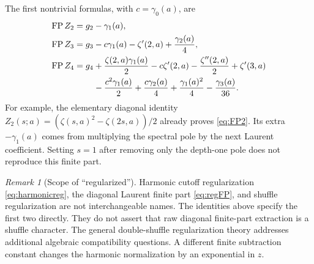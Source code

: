 \documentclass[11pt]{article}
\numberwithin{equation}{section}
\theoremstyle{definition}\newtheorem{definition}[theorem]{Definition}
\theoremstyle{remark}\newtheorem{remark}[theorem]{Remark}
\DeclareMathOperator{\FP}{FP}
\begin{document}
The first nontrivial formulas, with $c=\gamma_0(a)$, are
\begin{align}
 \FP Z_2&=g_2-\gamma_1(a),\label{eq:FP2}\\
 \FP Z_3&=g_3-c\gamma_1(a)-\zeta'(2,a)+\frac{\gamma_2(a)}4,
 \label{eq:FP3}\\
 \FP Z_4&=g_4+\frac{\zeta(2,a)\gamma_1(a)}2
       -c\zeta'(2,a)-\frac{\zeta''(2,a)}2+\zeta'(3,a)\notag\\
 &\hspace{8mm}-\frac{c^2\gamma_1(a)}2
       +\frac{c\gamma_2(a)}4+\frac{\gamma_1(a)^2}4
       -\frac{\gamma_3(a)}{36}.
 \label{eq:FP4}
\end{align}
For example, the elementary diagonal identity
$Z_2(s;a)=(\zeta(s,a)^2-\zeta(2s,a))/2$ already proves
\eqref{eq:FP2}. Its extra $-\gamma_1(a)$ comes from multiplying the
spectral pole by the next Laurent coefficient. Setting $s=1$ after removing
only the depth-one pole does not reproduce this finite part.

\begin{remark}[Scope of ``regularized'']
Harmonic cutoff regularization \eqref{eq:harmonicreg}, the diagonal Laurent
finite part \eqref{eq:regFP}, and shuffle regularization are not interchangeable
names. The identities above specify the first two directly. They do not
assert that raw diagonal finite-part extraction is a shuffle character.
The general double-shuffle regularization theory \cite{IKZ2006} addresses
additional algebraic compatibility questions. A different finite subtraction
constant changes the harmonic normalization by an exponential in $z$.
\end{remark}
\end{document}
